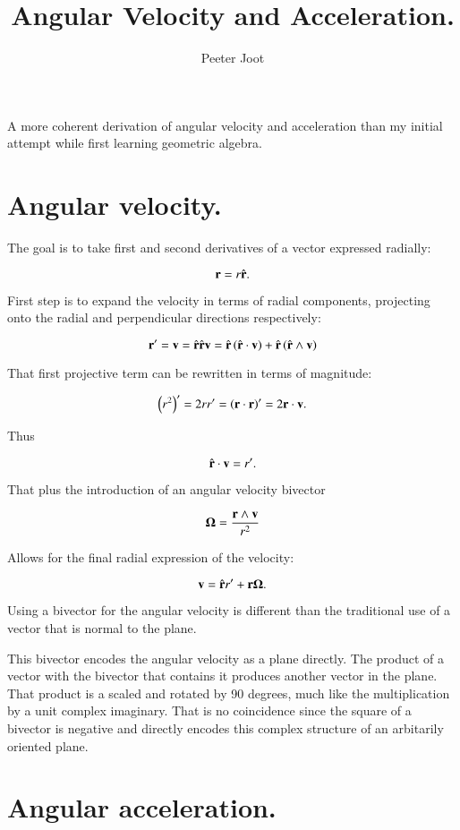 \documentclass{article}      %
\title{ Angular Velocity and Acceleration. } %
\author{Peeter Joot}         %
\newcommand{\BOmega}[0]{\boldsymbol{\Omega}}
\begin{document}

\maketitle{}

A more coherent derivation of angular velocity and acceleration than
my initial attempt while first learning geometric algebra.

\section{ Angular velocity. }

The goal is to take first and second derivatives of a vector expressed
radially:

\[
\mathbf{r} = r \hat{\mathbf{r}}.
\]

First step is to expand the velocity in terms of radial components,
projecting onto the radial and perpendicular directions respectively:

\[
\mathbf{r}' = \mathbf{v} = \hat{\mathbf{r}} \hat{\mathbf{r}} \mathbf{v} = \hat{\mathbf{r}} \left(\hat{\mathbf{r}} \cdot \mathbf{v}\right) + \hat{\mathbf{r}} \left(\hat{\mathbf{r}} \wedge \mathbf{v}\right)
\]

That first projective term can be rewritten in terms of magnitude:

\[
\left(r^2\right)' = 2 r r' = \left(\mathbf{r} \cdot \mathbf{r}\right)' = 2 \mathbf{r} \cdot \mathbf{v}.
\]

Thus

\[
\hat{\mathbf{r}} \cdot \mathbf{v} = r'.
\]

That plus the introduction of an angular velocity bivector

\[
\BOmega = \frac{\Br \wedge \Bv}{r^2}
\]

Allows for the final radial expression of the velocity:

\[
\Bv = \rcap r' + \Br \BOmega.
\]

Using a bivector for the angular velocity is different than the traditional
use of a vector that is normal to the plane.

This bivector encodes the
angular velocity as a plane directly.  The
product of a vector with the bivector that contains it produces another vector
in the plane.  That product is a scaled and rotated by 90 degrees, much like the
multiplication by a unit complex imaginary.  That is no coincidence since
the square of a bivector is negative and directly encodes this complex structure
of an arbitarily oriented plane.

\section{ Angular acceleration. }
\end{document}
